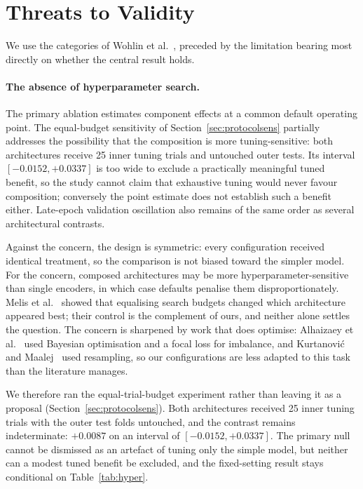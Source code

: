 \documentclass[11pt,a4paper]{article}
\begin{document}
\section{Threats to Validity}
\label{sec:threats}

We use the categories of Wohlin et al.~\cite{wohlin2012}, preceded by the limitation bearing
most directly on whether the central result holds.

\paragraph{The absence of hyperparameter search.}
The primary ablation estimates component effects at a common default operating point. The equal-budget
sensitivity of Section~\ref{sec:protocolsens} partially addresses the possibility that the composition is more
tuning-sensitive: both architectures receive 25 inner tuning trials and untouched outer tests. Its
interval $[-0.0152, +0.0337]$ is too wide to exclude a practically meaningful tuned benefit, so the study
cannot claim that exhaustive tuning would never favour composition; conversely the point estimate does not
establish such a benefit either. Late-epoch validation oscillation also remains of the same order as
several architectural contrasts.

Against the concern, the design is symmetric: every configuration received identical treatment,
so the comparison is not biased toward the simpler model. For the concern, composed
architectures may be more hyperparameter-sensitive than single encoders, in which case defaults
penalise them disproportionately. Melis et al.~\cite{melis2018} showed that equalising search
budgets changed which architecture appeared best; their control is the complement of ours, and
neither alone settles the question. The concern is sharpened by work that does optimise: Alhaizaey et al.~\cite{alhaizaey2025}
used Bayesian optimisation and a focal loss for imbalance, and Kurtanović and
Maalej~\cite{kurtanovic2017} used resampling, so our configurations are less adapted to this
task than the literature manages.

We therefore ran the equal-trial-budget experiment rather than leaving it as a proposal
(Section~\ref{sec:protocolsens}). Both architectures received 25 inner tuning trials with the outer test folds
untouched, and the contrast remains indeterminate: $+0.0087$ on an interval of $[-0.0152, +0.0337]$. The
primary null cannot be dismissed as an artefact of tuning only the simple model, but neither can a modest
tuned benefit be excluded, and the fixed-setting result stays conditional on Table~\ref{tab:hyper}.
\end{document}
